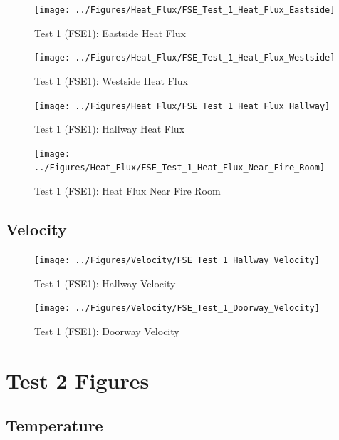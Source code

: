 \documentclass[12pt,oneside]{book}
\begin{document}
\begin{figure}[!ht]
	\texttt{[image: ../Figures/Heat\_Flux/FSE\_Test\_1\_Heat\_Flux\_Eastside]}
	\caption{Test 1 (FSE1): Eastside Heat Flux}
	\label{fig:Test_1_Eastside_Heat_Flux}
\end{figure}

\begin{figure}[!ht]
	\texttt{[image: ../Figures/Heat\_Flux/FSE\_Test\_1\_Heat\_Flux\_Westside]}
	\caption{Test 1 (FSE1): Westside Heat Flux}
	\label{fig:Test_1_Westside_Heat_Flux}
\end{figure}

\begin{figure}[!ht]
	\texttt{[image: ../Figures/Heat\_Flux/FSE\_Test\_1\_Heat\_Flux\_Hallway]}
	\caption{Test 1 (FSE1): Hallway Heat Flux}
	\label{fig:Test_1_Hallway_Heat_Flux}
\end{figure}

\begin{figure}[!ht]
	\texttt{[image: ../Figures/Heat\_Flux/FSE\_Test\_1\_Heat\_Flux\_Near\_Fire\_Room]}
	\caption{Test 1 (FSE1): Heat Flux Near Fire Room}
	\label{fig:Test_1_Heat_Flux_Near_Fire_Room}
\end{figure}

\subsection{Velocity}
\label{subsec:Velocity}

\begin{figure}[!ht]
	\texttt{[image: ../Figures/Velocity/FSE\_Test\_1\_Hallway\_Velocity]}
	\caption{Test 1 (FSE1): Hallway Velocity}
	\label{fig:Test_1_Hallway_Velocity}
\end{figure}

\begin{figure}[!ht]
	\texttt{[image: ../Figures/Velocity/FSE\_Test\_1\_Doorway\_Velocity]}
	\caption{Test 1 (FSE1): Doorway Velocity}
	\label{fig:Test_1_Doorway_Velocity}
\end{figure}

\clearpage

\section{Test 2 Figures}
\label{subsec:Test_2_Figures}

\subsection{Temperature}
\label{subsec:Temperature}
\end{document}
